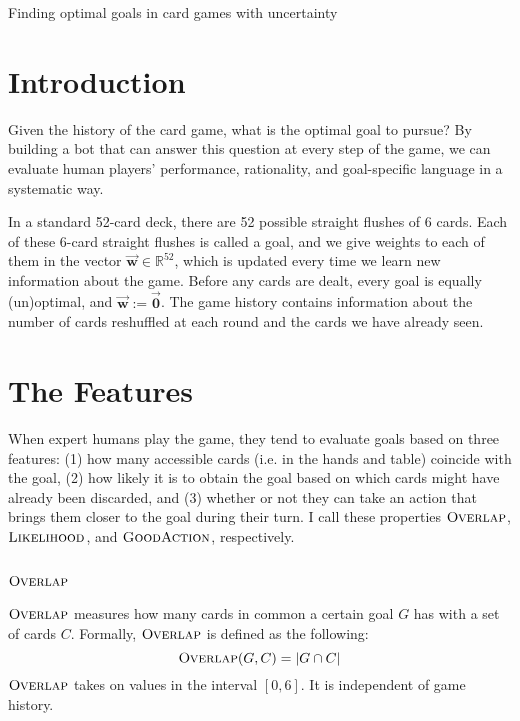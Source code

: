\documentclass[11pt]{article}
\newcommand{\bvec}[1]{\vec{\mathbf{#1}}}
\newcommand{\R}{\mathbb{R}}
\newcommand{\overlap}{\textsc{Overlap}}
\newcommand{\lkhd}{\textsc{Likelihood}}
\newcommand{\goodaction}{\textsc{GoodAction}}
\begin{document}
\begin{center}
\Large{Finding optimal goals in card games with uncertainty}
\end{center}

\section{Introduction}

Given the history of the card game, what is the optimal goal to pursue? By building a bot that can answer this question at every step of the game, we can evaluate human players' performance, rationality, and goal-specific language in a systematic way.

In a standard 52-card deck, there are 52 possible straight flushes of 6 cards. Each of these 6-card straight flushes is called a goal, and we give weights to each of them in the vector $\bvec{w} \in \R^{52}$, which is updated every time we learn new information about the game. Before any cards are dealt, every goal is equally (un)optimal, and $\bvec{w} := \bvec{0}$. The game history contains information about the number of cards reshuffled at each round and the cards we have already seen.

\section{The Features}

When expert humans play the game, they tend to evaluate goals based on three features: (1) how many accessible cards (i.e. in the hands and table) coincide with the goal, (2) how likely it is to obtain the goal based on which cards might have already been discarded, and (3) whether or not they can take an action that brings them closer to the goal during their turn. I call these properties $\overlap$, $\lkhd$, and $\goodaction$, respectively.

\subsection{$\overlap$}

$\overlap$ measures how many cards in common a certain goal $G$ has with a set of cards $C$. Formally, $\overlap$ is defined as the following:
\begin{equation}
\overlap(G,C) = |G \cap C|
\label{eq:overlap} \end{equation}
$\overlap$ takes on values in the interval $[0,6]$. It is independent of game history.
\end{document}
